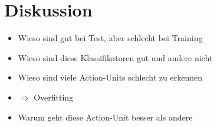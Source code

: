 \chapter{Diskussion}
\begin{itemize}
  \item Wieso sind gut bei Test, aber schlecht bei Training 
  \item Wieso sind diese Klassifikatoren gut und andere nicht
   \item Wieso sind viele Action-Units schlecht zu erkennen
  \item $\Rightarrow$ Overfitting
  \item Warum geht diese Action-Unit besser als andere
\end{itemize}

